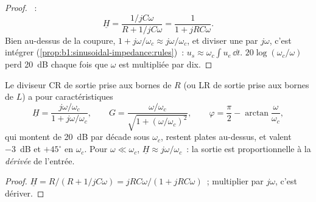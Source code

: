 \begin{proof}
~:
\[
\underline H = \frac{1/jC\omega}{R + 1/jC\omega} = \frac{1}{1 + jRC\omega} .
\]
Bien au-dessus de la coupure, $1 + j\omega/\omega_c \approx j\omega/\omega_c$,
et diviser une  par $j\omega$, c'est intégrer
(\cref{prop:b1:sinusoidal-impedance:rules})~: $u_s \approx \omega_c\int u_e\,\dd t$.
$20\log(\omega_c/\omega)$ perd \qty{20}{dB} chaque fois que $\omega$ est multipliée par dix.
\end{proof}

\begin{proposition}\label{prop:b1:filters-transfer-functions:highpass1}
Le diviseur CR de sortie prise aux bornes de $R$ (ou LR de sortie prise
aux bornes de $L$) a pour caractéristiques
\[
\underline H = \frac{j\omega/\omega_c}{1 + j\omega/\omega_c},
\qquad G = \frac{\omega/\omega_c}{\sqrt{1 + (\omega/\omega_c)^2}},
\qquad \varphi = \frac{\pi}{2} - \arctan\frac{\omega}{\omega_c},
\]
qui montent de \qty{20}{dB} par décade sous $\omega_c$, restent plates
au-dessus, et valent \qty{-3}{dB} et $+45^\circ$ en $\omega_c$. Pour
$\omega \ll \omega_c$, $\underline H
\approx j\omega/\omega_c$~: la sortie est proportionnelle à la
\emph{dérivée} de l'entrée.
\end{proposition}

\begin{proof}
$\underline H = R/(R + 1/jC\omega) = jRC\omega/(1 + jRC\omega)$~;
multiplier par $j\omega$, c'est dériver.
\end{proof}


